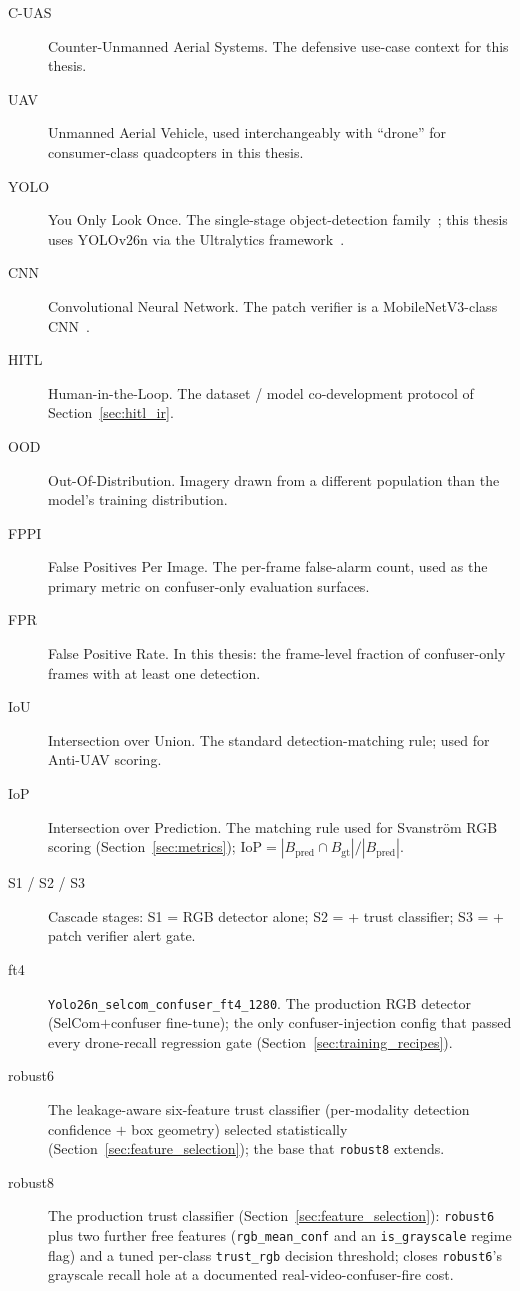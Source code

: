 \begin{description}
    \item[C-UAS] Counter-Unmanned Aerial Systems. The defensive use-case context for this thesis.
    \item[UAV] Unmanned Aerial Vehicle, used interchangeably with ``drone'' for consumer-class quadcopters in this thesis.
    \item[YOLO] You Only Look Once. The single-stage object-detection family~\cite{redmon2016yolo}; this thesis uses YOLOv26n via the Ultralytics framework~\cite{ultralytics2024}.
    \item[CNN] Convolutional Neural Network. The patch verifier is a MobileNetV3-class CNN~\cite{howard2019mobilenetv3}.
    \item[HITL] Human-in-the-Loop. The dataset / model co-development protocol of Section~\ref{sec:hitl_ir}.
    \item[OOD] Out-Of-Distribution. Imagery drawn from a different population than the model's training distribution.
    \item[FPPI] False Positives Per Image. The per-frame false-alarm count, used as the primary metric on confuser-only evaluation surfaces.
    \item[FPR] False Positive Rate. In this thesis: the frame-level fraction of confuser-only frames with at least one detection.
    \item[IoU] Intersection over Union. The standard detection-matching rule; used for Anti-UAV scoring.
    \item[IoP] Intersection over Prediction. The matching rule used for Svanstr\"om RGB scoring (Section~\ref{sec:metrics}); $\text{IoP} = |B_\text{pred} \cap B_\text{gt}| / |B_\text{pred}|$.
    \item[S1 / S2 / S3] Cascade stages: S1 = RGB detector alone; S2 = + trust classifier; S3 = + patch verifier alert gate.
    \item[ft4] \texttt{Yolo26n\_selcom\_confuser\_ft4\_1280}. The production RGB detector (SelCom$+$confuser fine-tune); the only confuser-injection config that passed every drone-recall regression gate (Section~\ref{sec:training_recipes}).
    \item[robust6] The leakage-aware six-feature trust classifier (per-modality detection confidence $+$ box geometry) selected statistically (Section~\ref{sec:feature_selection}); the base that \texttt{robust8} extends.
    \item[robust8] The production trust classifier (Section~\ref{sec:feature_selection}): \texttt{robust6} plus two further free features (\texttt{rgb\_mean\_conf} and an \texttt{is\_grayscale} regime flag) and a tuned per-class \texttt{trust\_rgb} decision threshold; closes \texttt{robust6}'s grayscale recall hole at a documented real-video-confuser-fire cost.

\end{description}
